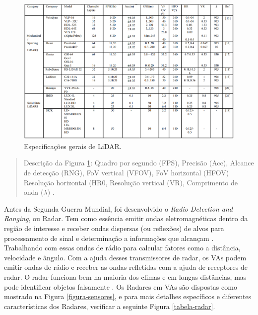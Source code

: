 \begin{figure}[H]
\centering
\includegraphics[width=\textwidth]{Figures/lidar-table.png}
\caption{Especificações gerais de LiDAR.}
\label{tabela-lidar}
\end{figure}

\begin{quote}
Descrição da Figura \ref{tabela-lidar}: Quadro por segundo (FPS), Precisão (Acc), Alcance de detecção (RNG), FoV vertical (VFOV), FoV horizontal (HFOV) Resolução horizontal (HR0, Resolução vertical (VR), Comprimento de onda ($\lambda$) \cite{sensors}.
\end{quote}





Antes da Segunda Guerra Mundial, foi desenvolvido o \textit{Radio Detection and Ranging}, ou Radar. Tem como essência emitir ondas eletromagnéticas dentro da região de interesse e receber ondas dispersas (ou reflexões) de alvos para processamento de sinal e determinação a informações que alcançam \cite{sensors}. Trabalhando com essas ondas de rádio para calcular fatores como a distância, velocidade e ângulo. Com a ajuda desses transmissores de radar, os VAs podem emitir ondas de rádio e receber as ondas refletidas com a ajuda de receptores de radar. O radar funciona bem na maioria dos climas e em longas distâncias, mas pode identificar objetos falsamente \cite{review-auto}.
Os Radares em VAs são dispostas como mostrado na Figura \ref{figura-sensores}, e para mais detalhes específicos e diferentes características dos Radares, verificar a seguinte Figura \ref{tabela-radar}.



